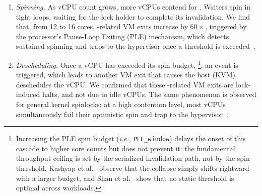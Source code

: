 \begin{enumerate}
\item {\it Spinning.}
  As vCPU count grows, more vCPUs contend for .
  Waiters spin in tight  loops, waiting for the lock holder to complete its invalidation.
  We find that, from 12 to 16 cores,
  -related VM exits
  increase by {$60\times$}, triggered by the processor's Pause-Loop Exiting (PLE) mechanism,
  which detects sustained spinning and traps to the
  hypervisor once a threshold is exceeded~\cite{Shan2017apples}.
\item \textit{Descheduling.}
  Once a vCPU has exceeded its spin budget,
  \footnote{Increasing the 
  PLE spin budget (\textit{i.e.}, \texttt{PLE\_window}) 
  delays the onset of this cascade to higher core counts 
  but does not prevent it: the fundamental throughput ceiling 
  is set by the serialized invalidation path, not by the 
  spin threshold.
  Kashyap et al.~\cite{Kashyap2016oppspinlocks} observe that 
  the collapse simply shifts rightward with a larger budget, 
  and Shan et al.~\cite{Shan2017apples} show that 
  no static threshold is optimal across workloads.},
\fi
  an  event is triggered, which leads to another VM exit that causes
  the host (KVM) deschedules the vCPU.
  We confirmed that these -related VM exits are lock-induced halts, and not due to idle vCPUs. 
  The same phenomenon is observed for general kernel spinlocks:
  at a high contention level, most vCPUs
  simultaneously fail their optimistic spin
  and trap to the hypervisor~\cite{Kashyap2016oppspinlocks}.

  
  



\end{enumerate}
